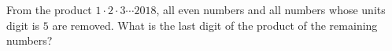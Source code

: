 From the product $1\cdot2\cdot3\cdots2018$, all even numbers and all numbers whose units digit is $5$ are removed. What is the last digit of the product of the remaining numbers?
